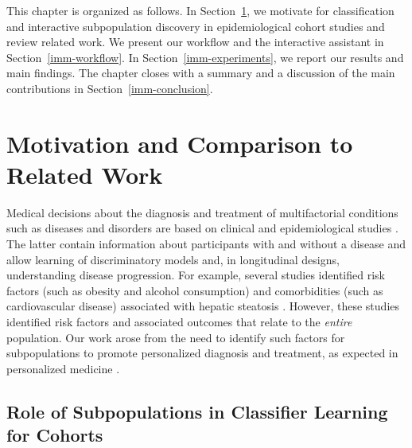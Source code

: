 \documentclass[
  oneside]{book}
\begin{document}
This chapter is organized as follows.
In Section~\ref{imm-intro}, we motivate for classification and interactive subpopulation discovery in epidemiological cohort studies and review related work.
We present our workflow and the interactive assistant in Section~\ref{imm-workflow}.
In Section~\ref{imm-experiments}, we report our results and main findings.
The chapter closes with a summary and a discussion of the main contributions in Section~\ref{imm-conclusion}.

\hypertarget{imm-intro}{%
\section{Motivation and Comparison to Related Work}\label{imm-intro}}

Medical decisions about the diagnosis and treatment of multifactorial conditions such as diseases and disorders are based on clinical and epidemiological studies \autocite{elmore2020jekel}.
The latter contain information about participants with and without a disease and allow learning of discriminatory models and, in longitudinal designs, understanding disease progression.
For example, several studies identified risk factors (such as obesity and alcohol consumption) and comorbidities (such as cardiovascular disease) associated with hepatic steatosis \autocite{IttermannEtAl:Thyroid2012,LauEtAl:2010,StickelEtAl:2011,Targher:2010,Markus:2013}.
However, these studies identified risk factors and associated outcomes that relate to the \emph{entire} population.
Our work arose from the need to identify such factors for subpopulations to promote personalized diagnosis and treatment, as expected in personalized medicine \autocite{Hingorani:2013,Voelzke:Cardiol2013}.

\hypertarget{role-of-subpopulations-in-classifier-learning-for-cohorts}{%
\subsection{Role of Subpopulations in Classifier Learning for Cohorts}\label{role-of-subpopulations-in-classifier-learning-for-cohorts}}
\end{document}
